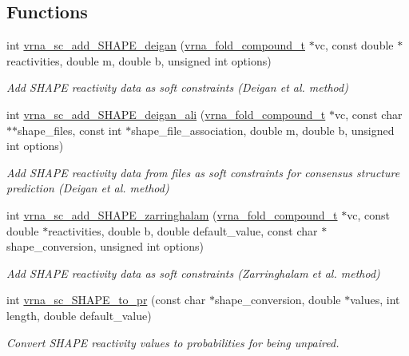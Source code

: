 \subsection*{Functions}
\begin{DoxyCompactItemize}
\item 
int \mbox{\hyperlink{group__SHAPE__reactivities_ga57d612b58e1c61dd6cfcb5a843f8f1b3}{vrna\+\_\+sc\+\_\+add\+\_\+\+S\+H\+A\+P\+E\+\_\+deigan}} (\mbox{\hyperlink{group__fold__compound_ga1b0cef17fd40466cef5968eaeeff6166}{vrna\+\_\+fold\+\_\+compound\+\_\+t}} $\ast$vc, const double $\ast$reactivities, double m, double b, unsigned int options)
\begin{DoxyCompactList}\small\item\em Add S\+H\+A\+PE reactivity data as soft constraints (Deigan et al. method) \end{DoxyCompactList}\item 
int \mbox{\hyperlink{group__SHAPE__reactivities_ga04ba85da63d8c793bb8001d1e6f800ba}{vrna\+\_\+sc\+\_\+add\+\_\+\+S\+H\+A\+P\+E\+\_\+deigan\+\_\+ali}} (\mbox{\hyperlink{group__fold__compound_ga1b0cef17fd40466cef5968eaeeff6166}{vrna\+\_\+fold\+\_\+compound\+\_\+t}} $\ast$vc, const char $\ast$$\ast$shape\+\_\+files, const int $\ast$shape\+\_\+file\+\_\+association, double m, double b, unsigned int options)
\begin{DoxyCompactList}\small\item\em Add S\+H\+A\+PE reactivity data from files as soft constraints for consensus structure prediction (Deigan et al. method) \end{DoxyCompactList}\item 
int \mbox{\hyperlink{group__SHAPE__reactivities_gaf3c65a045060aef5c4e41693d30af58c}{vrna\+\_\+sc\+\_\+add\+\_\+\+S\+H\+A\+P\+E\+\_\+zarringhalam}} (\mbox{\hyperlink{group__fold__compound_ga1b0cef17fd40466cef5968eaeeff6166}{vrna\+\_\+fold\+\_\+compound\+\_\+t}} $\ast$vc, const double $\ast$reactivities, double b, double default\+\_\+value, const char $\ast$shape\+\_\+conversion, unsigned int options)
\begin{DoxyCompactList}\small\item\em Add S\+H\+A\+PE reactivity data as soft constraints (Zarringhalam et al. method) \end{DoxyCompactList}\item 
int \mbox{\hyperlink{group__SHAPE__reactivities_ga67675b3ed48744489a3bcfa4174197cb}{vrna\+\_\+sc\+\_\+\+S\+H\+A\+P\+E\+\_\+to\+\_\+pr}} (const char $\ast$shape\+\_\+conversion, double $\ast$values, int length, double default\+\_\+value)
\begin{DoxyCompactList}\small\item\em Convert S\+H\+A\+PE reactivity values to probabilities for being unpaired. \end{DoxyCompactList}\end{DoxyCompactItemize}


